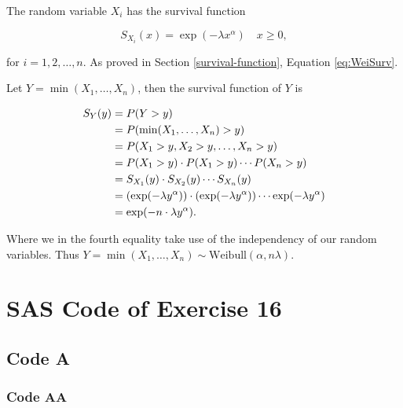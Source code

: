 \documentclass[a4paper,oneside]{memoir}
\begin{document}
The random variable \(X_i\) has the survival function

\[S_{X_i}(x)=\exp(-\lambda x^\alpha)\quad x\geq 0,\]

for \(i=1,2,\dots,n\). As proved in Section \ref{survival-function}, Equation \eqref{eq:WeiSurv}.

Let \(Y=\min(X_1,\dots,X_n)\), then the survival function of \(Y\) is

\begin{align}
S_Y(y)&=P(Y>y) \notag\\
      &=P(\min(X_1,\dots,X_n)>y) \notag\\
      &=P(X_1>y,X_2>y,\dots,X_n>y) \notag\\
      &=P(X_1>y)\cdot P(X_1>y)\cdots P(X_n>y) \notag\\
      &=S_{X_1}(y)\cdot S_{X_2}(y)\cdots S_{X_n}(y) \notag\\
      &=(\exp(-\lambda y^\alpha))\cdot (\exp(-\lambda y^\alpha))\cdots \exp(-\lambda y^\alpha) \notag\\
      &=\exp(-n\cdot\lambda y^\alpha). \label{eq:WeiMinSurv}
\end{align}

Where we in the fourth equality take use of the independency of our random variables. Thus \(Y=\min(X_1,\dots,X_n)\sim \text{Weibull}(\alpha, n\lambda)\).

\newpage

\hypertarget{appendix-appendix}{%
\appendix}


\hypertarget{sas-code-of-exercise-16}{%
\chapter{SAS Code of Exercise 16}\label{sas-code-of-exercise-16}}

\hypertarget{code-a}{%
\section{Code A}\label{code-a}}

\hypertarget{code-aa}{%
\subsection{Code AA}\label{code-aa}}
\end{document}
